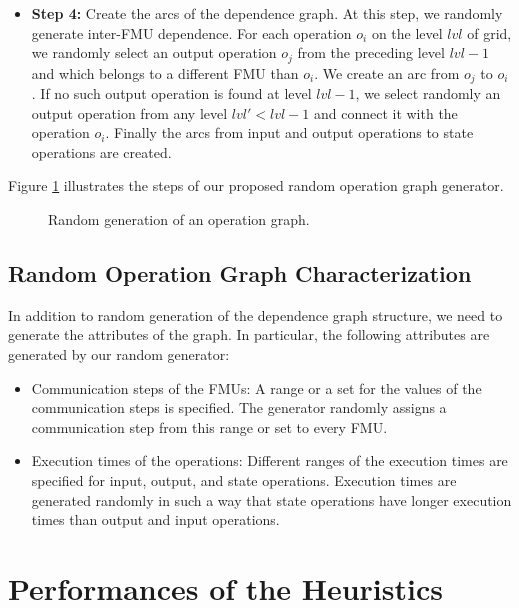 \begin{itemize}
\begin{enumerate}
\end{enumerate}
\item \textbf{Step 4:} Create the arcs of the dependence graph. At this step, we randomly generate inter-FMU dependence. For each operation $o_i$ on the level $lvl$ of grid, we randomly select an output operation $o_j$ from the preceding level $lvl-1$ and which belongs to a different FMU than $o_i$. We create an arc from $o_j$ to $o_i$. If no such output operation is found at level $lvl-1$, we select randomly an output operation from any level $lvl' < lvl-1$ and connect it with the operation $o_i$. Finally the arcs from input and output operations to state operations are created. 
\end{itemize}

Figure \ref{fig:genexample} illustrates the steps of our proposed random operation graph generator.

\begin{figure}[phbt]
\centering

\caption{Random generation of an operation graph.}
\label{fig:genexample}
\end{figure} 

\subsection{Random Operation Graph Characterization}

In addition to random generation of the dependence graph structure, we need to generate the attributes of the graph. In particular, the following attributes are generated by our random generator:
\begin{itemize}
\item Communication steps of the FMUs: A range or a set for the values of the communication steps is specified. The generator randomly assigns a communication step from this range or set to every FMU. 
\item Execution times of the operations: Different ranges of the execution times are specified for input, output, and state operations. Execution times are generated randomly in such a way that state operations have longer execution times than output and input operations.
\end{itemize}

\section{Performances of the Heuristics}

